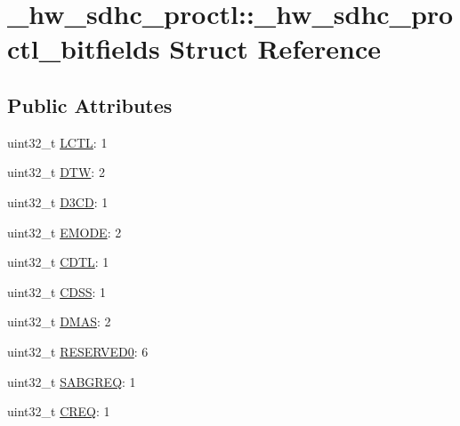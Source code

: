 \hypertarget{struct__hw__sdhc__proctl_1_1__hw__sdhc__proctl__bitfields}{}\section{\+\_\+hw\+\_\+sdhc\+\_\+proctl\+:\+:\+\_\+hw\+\_\+sdhc\+\_\+proctl\+\_\+bitfields Struct Reference}
\label{struct__hw__sdhc__proctl_1_1__hw__sdhc__proctl__bitfields}
\subsection*{Public Attributes}
\begin{DoxyCompactItemize}
\item 
uint32\+\_\+t \hyperlink{struct__hw__sdhc__proctl_1_1__hw__sdhc__proctl__bitfields_aa6af3762c925593d337b907d0c40e65c}{L\+C\+TL}\+: 1
\item 
uint32\+\_\+t \hyperlink{struct__hw__sdhc__proctl_1_1__hw__sdhc__proctl__bitfields_aabf617439c190d91980d447ee2d9cb30}{D\+TW}\+: 2
\item 
uint32\+\_\+t \hyperlink{struct__hw__sdhc__proctl_1_1__hw__sdhc__proctl__bitfields_afc2a4d1b01e428c19d343ee37386b075}{D3\+CD}\+: 1
\item 
uint32\+\_\+t \hyperlink{struct__hw__sdhc__proctl_1_1__hw__sdhc__proctl__bitfields_a74efdc2968daad795cebcbf4d506e1dd}{E\+M\+O\+DE}\+: 2
\item 
uint32\+\_\+t \hyperlink{struct__hw__sdhc__proctl_1_1__hw__sdhc__proctl__bitfields_aae2b398a2adb9403102b1f22dfb8d5d7}{C\+D\+TL}\+: 1
\item 
uint32\+\_\+t \hyperlink{struct__hw__sdhc__proctl_1_1__hw__sdhc__proctl__bitfields_a2b8fd3f5f7fd223b514ecedff4283cad}{C\+D\+SS}\+: 1
\item 
uint32\+\_\+t \hyperlink{struct__hw__sdhc__proctl_1_1__hw__sdhc__proctl__bitfields_a432f62d94b9b32c6c5fd9e4c424cfead}{D\+M\+AS}\+: 2
\item 
uint32\+\_\+t \hyperlink{struct__hw__sdhc__proctl_1_1__hw__sdhc__proctl__bitfields_abaa8920c4a4f71380cbfe55b305a2e45}{R\+E\+S\+E\+R\+V\+E\+D0}\+: 6
\item 
uint32\+\_\+t \hyperlink{struct__hw__sdhc__proctl_1_1__hw__sdhc__proctl__bitfields_ac66b9fc57052baeed9766adbda373f01}{S\+A\+B\+G\+R\+EQ}\+: 1
\item 
uint32\+\_\+t \hyperlink{struct__hw__sdhc__proctl_1_1__hw__sdhc__proctl__bitfields_a8ecc5b816e2e4a739f66461d7b96cd37}{C\+R\+EQ}\+: 1

\end{DoxyCompactItemize}
